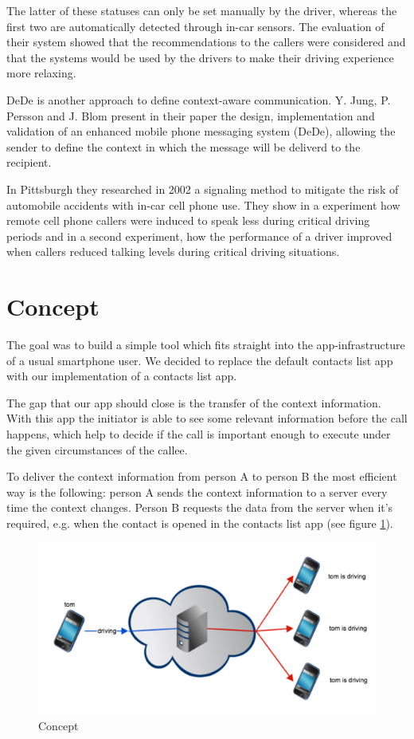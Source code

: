 \documentclass{sigchi}
\begin{document}
 The latter of these statuses can only be set manually by the driver, whereas the first two are automatically detected through in-car sensors. The evaluation of their system showed that the recommendations to the callers were considered and that the systems would be used by the drivers to make their driving experience more relaxing.
 
 DeDe is another approach to define context-aware communication. Y. Jung, P. Persson and J. Blom present in their paper \cite{jung05} the design, implementation and validation of an enhanced mobile phone messaging system (DeDe), allowing the sender to define the context in which the message will be deliverd to the recipient.
 
 In Pittsburgh they researched in 2002 \cite{samar02} a signaling method to mitigate the risk of automobile accidents with in-car cell phone use. They show in a experiment how remote cell phone callers were induced to speak less during critical driving periods and in a second experiment, how the performance of a driver improved when callers reduced talking levels during critical driving situations.

\section{Concept}
The goal was to build a simple tool which fits straight into the app-infrastructure of a usual smartphone user. We decided to replace the default contacts list app with our implementation of a contacts list app.

The gap that our app should close is the transfer of the context information. With this app the initiator is able to see some relevant information before the call happens, which help to decide if the call is important enough to execute under the given circumstances of the callee.

To deliver the context information from person A to person B the most efficient way is the following:
person A sends the context information to a server every time the context changes. Person B requests the data from the server when it's required, e.g. when the contact is opened in the contacts list app (see figure \ref{fig:app_concept}).

\begin{figure}[H]
	\centering
		\includegraphics[width=.95\linewidth]{figures/concept}
		\caption{Concept}
	\label{fig:app_concept}
\end{figure}
\end{document}
